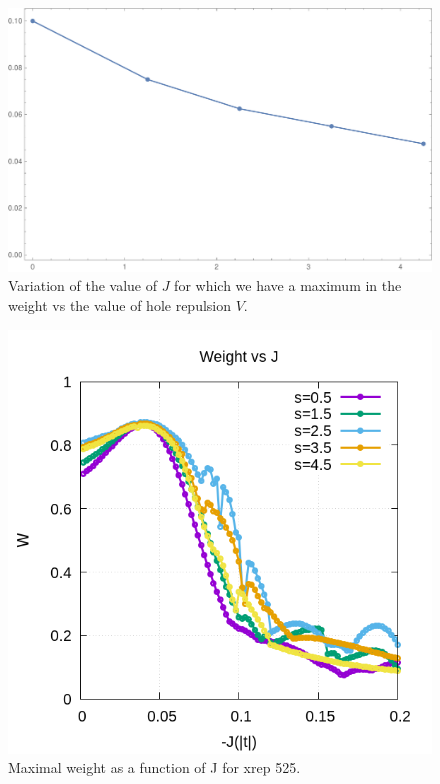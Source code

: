 \documentclass[ openright,titlepage,numbers=noenddot,headinclude,twoside,%
                footinclude=true,cleardoublepage=empty,abstractoff,%
                BCOR=5mm,paper=a4,fontsize=11pt,%
                ngerman,american,%
]{scrreprt}
\begin{document}
\begin{figure}[ht]
    \centering
    \includegraphics[scale=0.5]{12_4h_J_wmax_vs_xrep.pdf}
    \caption{\label{fig:}Variation of the value of $J$ for which we have a maximum in the weight vs the value of hole repulsion $V$. }
\end{figure}


\begin{figure}[ht]
    \centering
    \includegraphics[scale=0.5]{Wmax_vs_J_xrep525.png}
    \caption{\label{fig:}Maximal weight as a function of J for xrep 525. }
\end{figure}
\end{document}
